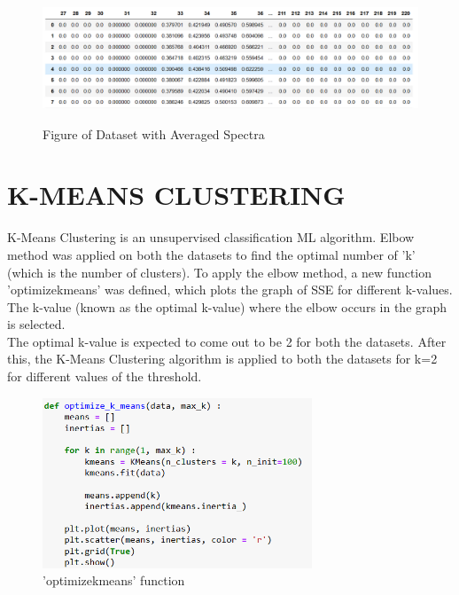\documentclass{article}
\begin{document}
\begin{figure}[H]
	\centering 
	\includegraphics[height=1.5in]{Averaged Dataset.png}
	\caption[Optional Caption]{Figure of Dataset with Averaged Spectra}
	\label{fig:fig4}
\end{figure}
\newpage
\section{K-MEANS CLUSTERING}
K-Means Clustering is an unsupervised classification ML algorithm. Elbow method was applied on both the datasets to find the optimal number of 'k' (which is the number of clusters). To apply the elbow method, a new function 'optimize\textunderscore k\textunderscore means' was defined, which plots the graph of SSE for different k-values. The k-value (known as the optimal k-value) where the elbow occurs in the graph is selected. \\
\newline
The optimal k-value is expected to come out to be 2 for both the datasets. After this, the K-Means Clustering algorithm is applied to both the datasets for k=2 for different values of the threshold.\\
\begin{figure}[H]
	\centering
	\includegraphics[height=2in]{Optimize k means.png}
	\caption[Optional Caption]{'optimize\textunderscore k\textunderscore means' function} 
	\label{fig:fig5}
\end{figure}
\end{document}
